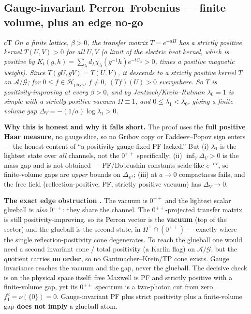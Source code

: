 \subsection{Gauge-invariant Perron--Frobenius --- \LT{} finite volume, plus an edge no-go}


\begin{claimbox}{cT}
 \emph{On a finite lattice, $\beta>0$, the transfer
matrix $T=e^{-aH}$ has a strictly positive kernel $T(U,V)>0$ for all $U,V$ (a limit of the
electric heat kernel, which is positive by
$K_t(g,h)=\sum_\lambda d_\lambda\chi_\lambda(g^{-1}h)e^{-tC_\lambda}>0$, times a positive
magnetic weight). Since $T(gU,gV)=T(U,V)$, it descends to a strictly positive kernel
$\bar T$ on $\mathcal{A}/\mathcal{G}$; for $0\le f\in \mathcal{H}_{\mathrm{phys}}$, $f\ne0$,
$(Tf)(U)>0$ everywhere. So $T$ is positivity-improving at every $\beta>0$, and by
Jentzsch/Krein--Rutman $\lambda_0=1$ is simple with a strictly positive vacuum $\Omega\equiv1$,
and $0\le\lambda_1<\lambda_0$, giving a finite-volume gap
$\Delta_V=-(1/a)\log\lambda_1>0$.}

\smallskip
\textbf{Why this is honest and why it falls short.} The proof uses the \textbf{full positive
Haar measure}, no gauge slice, so no Gribov copy or Faddeev--Popov sign enters --- the honest
content of ``a positivity gauge-fixed PF lacked.'' But (i) $\lambda_1$ is the lightest state
over \emph{all} channels, not the $0^{++}$ specifically; (ii) $\inf_V\Delta_V>0$ is the mass gap
and is not obtained --- PF/Dobrushin constants scale like $e^{-cV}$, so finite-volume gaps are
\emph{upper} bounds on $\Delta_{\mathbb{R}^4}$; (iii) at $a\to0$ compactness fails, and the free
field (reflection-positive, PF, strictly positive vacuum) has $\Delta_V\to0$.

\smallskip
\textbf{The exact edge obstruction \LN.} The vacuum is $0^{++}$ and the lightest scalar
glueball is \emph{also} $0^{++}$: they share the channel. The $0^{++}$-projected transfer matrix
is still positivity-improving, so its Perron vector is the \textbf{vacuum} (top of the sector)
and the glueball is the second state, in $\Omega^\perp\cap(0^{++})$ --- exactly where the single
reflection-positivity cone degenerates. To reach the glueball one would need a second invariant
cone / total positivity (a Karlin flag) on $\mathcal{A}/\mathcal{G}$, but the quotient carries
\textbf{no order}, so no Gantmacher--Krein/TP cone exists. Gauge invariance reaches the vacuum
and the gap, never the glueball. The decisive check is on the physical space itself: free
Maxwell is PF and strictly positive with a finite-volume gap, yet its $0^{++}$ spectrum is a
two-photon cut from zero, $f_1^2=\nu(\{0\})=0$. Gauge-invariant PF plus strict positivity plus a
finite-volume gap \textbf{does not imply} a glueball atom.
\end{claimbox}

